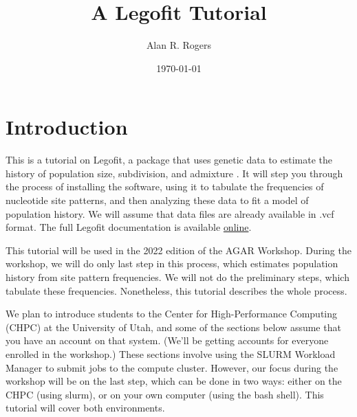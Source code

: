 \documentclass[11pt]{article}
\begin{document}
\title{A Legofit Tutorial}
\author{Alan R. Rogers}
\date{\today}
\maketitle
\tableofcontents

\section{Introduction}
This is a tutorial on Legofit, a package that uses genetic data to
estimate the history of population size, subdivision, and admixture
\citep{Rogers:BMC-20-526, Rogers:PCJ-2-e32}. It will step you through
the process of installing the software, using it to tabulate the
frequencies of nucleotide site patterns, and then analyzing these data
to fit a model of population history. We will assume that data files
are already available in .vcf format. The full Legofit documentation
is available
\href{http://alanrogers.github.io/legofit/html/index.html}{online}.

This tutorial will be used in the 2022 edition of the AGAR
Workshop. During the workshop, we will do only last step in this
process, which estimates population history from site pattern
frequencies. We will not do the preliminary steps, which tabulate
these frequencies. Nonetheless, this tutorial describes the whole
process.

We plan to introduce students to the Center for High-Performance
Computing (CHPC) at the University of Utah, and some of the sections
below assume that you have an account on that system. (We'll be
getting accounts for everyone enrolled in the workshop.) These
sections involve using the SLURM Workload Manager to submit jobs to
the compute cluster. However, our focus during the workshop will be on
the last step, which can be done in two ways: either on the CHPC
(using slurm), or on your own computer (using the bash shell). This
tutorial will cover both environments.
\end{document}
